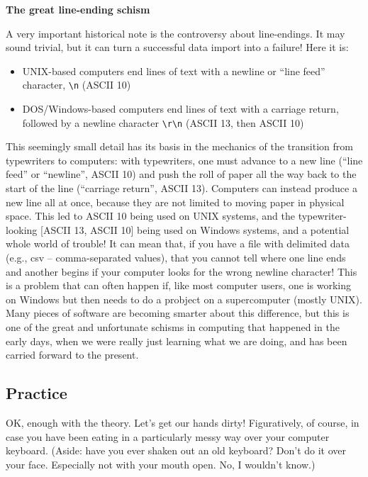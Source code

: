 \documentclass[a4paper,10pt]{scrartcl}
\begin{document}
\begin{framed}
\noindent\textbf{The great line-ending schism}

A very important historical note is the controversy about line-endings. It may sound trivial, but it can turn a successful data import into a failure! Here it is:
\begin{itemize}
 \item UNIX-based computers end lines of text with a newline or ``line feed'' character, \lstinline{\n} (ASCII 10)
 \item DOS/Windows-based computers end lines of text with a carriage return, followed by a newline character \lstinline{\r\n} (ASCII 13, then ASCII 10)
\end{itemize}
This seemingly small detail has its basis in the mechanics of the transition from typewriters to computers: with typewriters, one must advance to a new line (``line feed'' or ``newline'', ASCII 10) and push the roll of paper all the way back to the start of the line (``carriage return'', ASCII 13). Computers can instead produce a new line all at once, because they are not limited to moving paper in physical space. This led to ASCII 10 being used on UNIX systems, and the typewriter-looking [ASCII 13, ASCII 10] being used on Windows systems, and a potential whole world of trouble! It can mean that, if you have a file with delimited data (e.g., csv -- comma-separated values), that you cannot tell where one line ends and another begins if your computer looks for the wrong newline character! This is a problem that can often happen if, like most computer users, one is working on Windows but then needs to do a probject on a supercomputer (mostly UNIX). Many pieces of software are becoming smarter about this difference, but this is one of the great and unfortunate schisms in computing that happened in the early days, when we were really just learning what we are doing, and has been carried forward to the present.
\end{framed}

\subsection{Practice}

OK, enough with the theory. Let's get our hands dirty! Figuratively, of course, in case you have been eating in a particularly messy way over your computer keyboard. (Aside: have you ever shaken out an old keyboard? Don't do it over your face. Especially not with your mouth open. No, I wouldn't know.)
\end{document}
